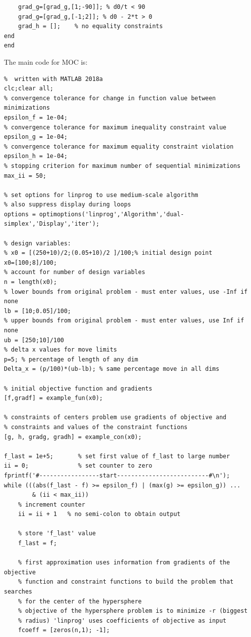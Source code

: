 \documentclass[12pt]{article}
\begin{document}
\begin{enumerate}[I]
\begin{enumerate}[1)]
\begin{lstlisting}
    grad_g=[grad_g,[1;-90]]; % d0/t < 90
    grad_g=[grad_g,[-1;2]]; % d0 - 2*t > 0
    grad_h = [];    % no equality constraints
end
end
\end{lstlisting}

The main code for MOC is:
\begin{lstlisting}
%  written with MATLAB 2018a
clc;clear all;
% convergence tolerance for change in function value between minimizations
epsilon_f = 1e-04;
% convergence tolerance for maximum inequality constraint value
epsilon_g = 1e-04;
% convergence tolerance for maximum equality constraint violation
epsilon_h = 1e-04;
% stopping criterion for maximum number of sequential minimizations
max_ii = 50;

% set options for linprog to use medium-scale algorithm
% also suppress display during loops
options = optimoptions('linprog','Algorithm','dual-simplex','Display','iter');

% design variables:
% x0 = [(250+10)/2;(0.05+10)/2 ]/100;% initial design point 
x0=[100;8]/100;
% account for number of design variables
n = length(x0);
% lower bounds from original problem - must enter values, use -Inf if none
lb = [10;0.05]/100;
% upper bounds from original problem - must enter values, use Inf if none
ub = [250;10]/100
% delta x values for move limits
p=5; % percentage of length of any dim
Delta_x = (p/100)*(ub-lb); % same percentage move in all dims

% initial objective function and gradients
[f,gradf] = example_fun(x0);

% constraints of centers problem use gradients of objective and
% constraints and values of the constraint functions
[g, h, gradg, gradh] = example_con(x0);

f_last = 1e+5;       % set first value of f_last to large number
ii = 0;              % set counter to zero
fprintf('#-----------------start--------------------------#\n');
while (((abs(f_last - f) >= epsilon_f) | (max(g) >= epsilon_g)) ...
        & (ii < max_ii))
    % increment counter
    ii = ii + 1   % no semi-colon to obtain output

    % store 'f_last' value
    f_last = f;
    
    % first approximation uses information from gradients of the objective
    % function and constraint functions to build the problem that searches
    % for the center of the hypersphere
    % objective of the hypersphere problem is to minimize -r (biggest
    % radius) 'linprog' uses coefficients of objective as input
    fcoeff = [zeros(n,1); -1];


\end{lstlisting}
\end{enumerate}
\end{enumerate}
\end{document}
